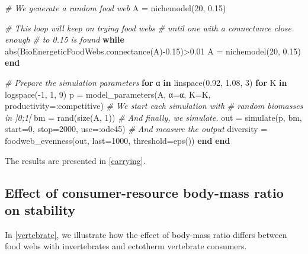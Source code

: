 \documentclass[12pt]{article}
\newenvironment{Shaded}{}{}
\newcommand{\KeywordTok}[1]{{\textbf{{#1}}}}
\newcommand{\FloatTok}[1]{{{#1}}}
\newcommand{\CommentTok}[1]{\textcolor[rgb]{0.38,0.63,0.69}{\textit{{#1}}}}
\newcommand{\NormalTok}[1]{{#1}}
\begin{document}
\begin{Shaded}
\begin{Highlighting}[]
\CommentTok{# We generate a random food web}
\NormalTok{A = nichemodel(}\FloatTok{20}\NormalTok{, }\FloatTok{0.15}\NormalTok{)}

\CommentTok{# This loop will keep on trying food webs}
\CommentTok{# until one with a connectance close enough}
\CommentTok{# to 0.15 is found}
\KeywordTok{while} \NormalTok{abs(BioEnergeticFoodWebs.connectance(A)-}\FloatTok{0.15}\NormalTok{)>}\FloatTok{0.01}
    \NormalTok{A = nichemodel(}\FloatTok{20}\NormalTok{, }\FloatTok{0.15}\NormalTok{)}
\KeywordTok{end}

\CommentTok{# Prepare the simulation parameters}
\KeywordTok{for} \NormalTok{α }\KeywordTok{in} \NormalTok{linspace(}\FloatTok{0.92}\NormalTok{, }\FloatTok{1.08}\NormalTok{, }\FloatTok{3}\NormalTok{)}
  \KeywordTok{for} \NormalTok{K }\KeywordTok{in} \NormalTok{logspace(-}\FloatTok{1}\NormalTok{, }\FloatTok{1}\NormalTok{, }\FloatTok{9}\NormalTok{)}
    \NormalTok{p = model_parameters(A, α=α,}
        \NormalTok{K=K,}
        \NormalTok{productivity=:competitive)}
    \CommentTok{# We start each simulation with}
    \CommentTok{# random biomasses in ]0;1[}
    \NormalTok{bm = rand(size(A, }\FloatTok{1}\NormalTok{))}
    \CommentTok{# And finally, we simulate.}
    \NormalTok{out = simulate(p, bm, start=}\FloatTok{0}\NormalTok{,}
          \NormalTok{stop=}\FloatTok{2000}\NormalTok{, use=:ode45)}
    \CommentTok{# And measure the output}
    \NormalTok{diversity = foodweb_evenness(out,}
                    \NormalTok{last=}\FloatTok{1000}\NormalTok{,}
                    \NormalTok{threshold=eps())}
  \KeywordTok{end}
\KeywordTok{end}
\end{Highlighting}
\end{Shaded}

The results are presented in \autoref{carrying}.

\subsection{Effect of consumer-resource body-mass ratio on
stability}\label{effect-of-consumer-resource-body-mass-ratio-on-stability}

In \autoref{vertebrate}, we illustrate how the effect of body-mass ratio
differs between food webs with invertebrates and ectotherm vertebrate
consumers.
\end{document}
